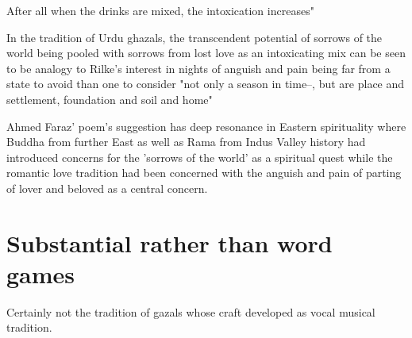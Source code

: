 \documentclass{amsart}
\begin{document}
After all when the drinks are mixed, the intoxication increases"

In the tradition of Urdu ghazals, the transcendent potential of sorrows of the world being pooled with sorrows from lost love as an intoxicating mix can be seen to be analogy to Rilke's interest in nights of anguish and pain  being far from a state to avoid than one to consider "not only a season in time--, but are place and settlement, foundation and soil and home"  

Ahmed Faraz' poem's suggestion has deep resonance in Eastern spirituality where Buddha from further East as well as Rama from Indus Valley history had introduced concerns for the 'sorrows of the world' as a spiritual quest while the romantic love tradition had been concerned with the anguish and pain of parting of lover and beloved as a central concern.  

\section{Substantial rather than word games}

Certainly not the tradition of gazals whose craft developed as vocal musical tradition.  


\begin{thebibliography}{CCCC}
\end{thebibliography}
\end{document}

